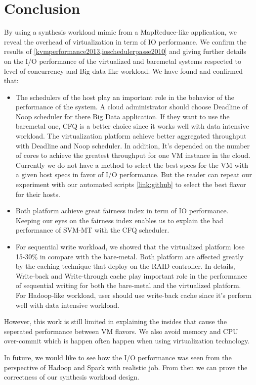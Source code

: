 \documentclass{acmsig}
\begin{document}
\section{Conclusion}
By using a synthesis workload mimic from a MapReduce-like application, we reveal the overhead of virtualization in term of IO performance. We confirm the results of \ref{kvmperformance2013,ioschedulerpasse2010} and giving further details on the I/O performance of the virtualized and baremetal systems respected to level of concurrency and Big-data-like workload. We have found and confirmed that:
\begin{itemize}
  \item The schedulers of the host play an important role in the behavior of the performance of the system. A cloud administrator should choose Deadline of Noop scheduler for there Big Data application. If they want to use the baremetal one, CFQ is a better choice since it works well with data intensive workload. The virtualization platform achieve better aggregated throughput with Deadline and Noop scheduler. In addition, It's depended on the number of cores to achieve the greatest throughput for one VM instance in the cloud. Currently we do not have a method to select the best specs for the VM with a given host specs in favor of I/O performance. But the reader can repeat our experiment with our automated scripts \ref{link:github} to select the best flavor for their hosts.
  \item Both platform achieve great fairness index in term of IO performance. Keeping our eyes on the fairness index enables us to explain the bad performance of SVM-MT with the CFQ scheduler.
  \item For sequential write workload, we showed that the virtualized platform lose 15-30\% in compare with the bare-metal. Both platform are affected greatly by the caching technique that deploy on the RAID controller. In details, Write-back and Write-through cache play important role in the performance of sequential writing for both the bare-metal and the virtualized platform. For Hadoop-like workload, user should use write-back cache since it's perform well with data intensive workload.
\end{itemize}
However, this work is still limited in explaining the insides that cause the seperated performance between VM flavors. We also avoid memory and CPU over-commit which is happen often happen when using virtualization technology.

In future, we would like to see how the I/O performance was seen from the perspective of Hadoop and Spark with realistic job. From then we can prove the correctness of our synthesis workload design.




% 
% 
\end{document}
